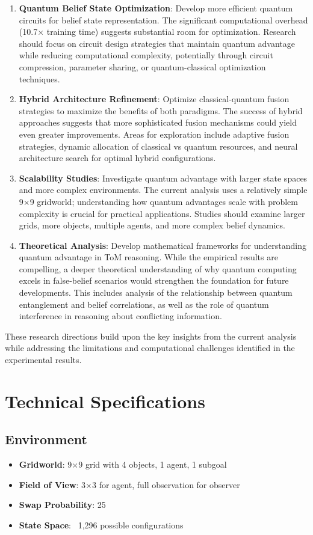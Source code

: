 \documentclass[11pt]{article}
\begin{document}
\begin{enumerate}
    \item \textbf{Quantum Belief State Optimization}: Develop more efficient quantum circuits for belief state representation. The significant computational overhead (10.7× training time) suggests substantial room for optimization. Research should focus on circuit design strategies that maintain quantum advantage while reducing computational complexity, potentially through circuit compression, parameter sharing, or quantum-classical optimization techniques.
    \item \textbf{Hybrid Architecture Refinement}: Optimize classical-quantum fusion strategies to maximize the benefits of both paradigms. The success of hybrid approaches suggests that more sophisticated fusion mechanisms could yield even greater improvements. Areas for exploration include adaptive fusion strategies, dynamic allocation of classical vs quantum resources, and neural architecture search for optimal hybrid configurations.
    \item \textbf{Scalability Studies}: Investigate quantum advantage with larger state spaces and more complex environments. The current analysis uses a relatively simple 9×9 gridworld; understanding how quantum advantages scale with problem complexity is crucial for practical applications. Studies should examine larger grids, more objects, multiple agents, and more complex belief dynamics.
    \item \textbf{Theoretical Analysis}: Develop mathematical frameworks for understanding quantum advantage in ToM reasoning. While the empirical results are compelling, a deeper theoretical understanding of why quantum computing excels in false-belief scenarios would strengthen the foundation for future developments. This includes analysis of the relationship between quantum entanglement and belief correlations, as well as the role of quantum interference in reasoning about conflicting information.
\end{enumerate}

These research directions build upon the key insights from the current analysis while addressing the limitations and computational challenges identified in the experimental results.

\section{Technical Specifications}

\subsection{Environment}
\begin{itemize}
    \item \textbf{Gridworld}: 9×9 grid with 4 objects, 1 agent, 1 subgoal
    \item \textbf{Field of View}: 3×3 for agent, full observation for observer
    \item \textbf{Swap Probability}: 25%
    \item \textbf{State Space}: ~1,296 possible configurations
\end{itemize}
\end{document}
